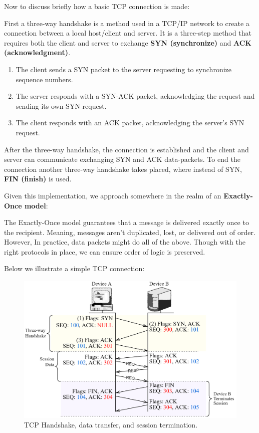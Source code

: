 \noindent
Now to discuss briefly how a basic TCP connection is made:
\begin{Def}

    First a three-way handshake is a method used in a TCP/IP network to create a connection between a local host/client and server. 
    It is a three-step method that requires both the client and server to exchange \textbf{SYN (synchronize)}
     and \textbf{ACK (acknowledgment)}.
     \begin{enumerate}
        \item The client sends a SYN packet to the server requesting to synchronize sequence numbers.
        \item The server responds with a SYN-ACK packet, acknowledging the request and sending its own SYN request.
        \item The client responds with an ACK packet, acknowledging the server's SYN request.
     \end{enumerate}
    
    \noindent
    After the three-way handshake, the connection is established and the client and server can communicate exchanging SYN and ACK data-packets.
    To end the connection another three-way handshake takes placed, where instead of SYN, \textbf{FIN (finish)} is used.
    
\end{Def}

\noindent
Given this implementation, we approach somewhere in the realm of an \textbf{Exactly-Once model}:

\begin{Def}

    The Exactly-Once model guarantees that a message is delivered exactly once to the recipient. Meaning, messages aren't duplicated, lost, or delivered out of order.
    However, In practice, data packets might do all of the above. Though with the right
    protocols in place, we can ensure order of logic is preserved.
\end{Def}

\newpage 
\noindent
Below we illustrate a simple TCP connection:
\begin{figure}[h]
    \centering
    \includegraphics[width=1\textwidth]{Sections/rpc/sync.png}
    \caption{TCP Handshake, data transfer, and session termination.}
    \label{fig:tcp}
\end{figure}

